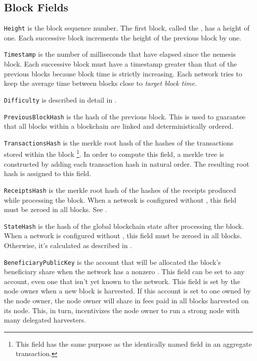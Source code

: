 \subsection{Block Fields}

\texttt{Height} is the block sequence number.
The first block, called the , has a height of one.
Each successive block increments the height of the previous block by one.

\texttt{Timestamp} is the number of milliseconds that have elapsed since the nemesis block.
Each successive block must have a timestamp greater than that of the previous blocks because block time is strictly increasing.
Each network tries to keep the average time between blocks close to \textit{target block time}.

\texttt{Difficulty} is described in detail in .

\texttt{PreviousBlockHash} is the hash of the previous block.
This is used to guarantee that all blocks within a blockchain are linked and deterministically ordered.

\texttt{TransactionsHash} is the merkle root hash of the hashes of the transactions stored within the block
\footnote{This field has the same purpose as the identically named field in an aggregate transaction.}.
In order to compute this field, a merkle tree is constructed by adding each transaction hash in natural order.
The resulting root hash is assigned to this field.

\texttt{ReceiptsHash} is the merkle root hash of the hashes of the receipts produced while processing the block.
When a network is configured without , this field must be zeroed in all blocks.
See .

\texttt{StateHash} is the hash of the global blockchain state after processing the block.
When a network is configured without , this field must be zeroed in all blocks.
Otherwise, it's calculated as described in .

\texttt{BeneficiaryPublicKey} is the account that will be allocated the block's beneficiary share when the network has a nonzero .
This field can be set to any account, even one that isn't yet known to the network.
This field is set by the node owner when a new block is harvested.
If this account is set to one owned by the node owner, the node owner will share in fees paid in all blocks harvested on its node.
This, in turn, incentivizes the node owner to run a strong node with many delegated harvesters.

